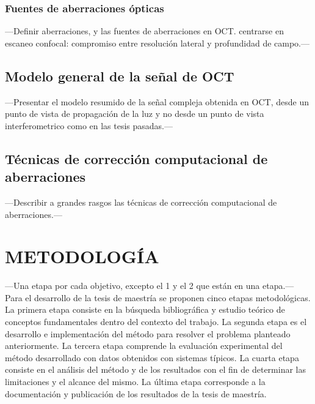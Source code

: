 \documentclass[letter, 12 pt]{article}
\begin{document}
		\subsubsection{Fuentes de aberraciones ópticas}
---Definir aberraciones, y las fuentes de aberraciones en OCT. centrarse en escaneo confocal: compromiso entre resolución lateral y profundidad de campo.---

	\subsection{Modelo general de la señal de OCT}
---Presentar el modelo resumido de la señal compleja obtenida en OCT, desde un punto de vista de propagación de la luz y no desde un punto de vista interferometrico como en las tesis pasadas.---

	\subsection{Técnicas de corrección computacional de aberraciones}
---Describir a grandes rasgos las técnicas de corrección computacional de aberraciones.---


\section{METODOLOGÍA}
---Una etapa por cada objetivo, excepto el 1 y el 2 que están en una etapa.---\\

Para el desarrollo de la tesis de maestría se proponen cinco etapas metodológicas. La primera etapa consiste en la búsqueda bibliográfica y estudio teórico de conceptos fundamentales dentro del contexto del trabajo. La segunda etapa es el desarrollo e implementación del método para resolver el problema planteado anteriormente. La tercera etapa comprende la evaluación experimental del método desarrollado con datos obtenidos con sistemas típicos. La cuarta etapa consiste en el análisis del método y de los resultados con el fin de determinar las limitaciones y el alcance del mismo. La última etapa corresponde a la documentación y publicación de los resultados de la tesis de maestría. \\
\end{document}
